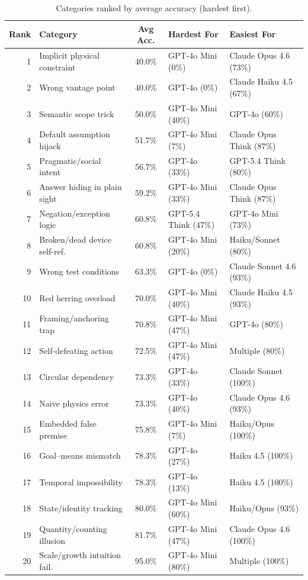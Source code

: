 \documentclass[11pt]{article}
\begin{document}
\begin{table}[ht]
\centering
\caption{Categories ranked by average accuracy (hardest first).}
\label{tab:difficulty}
\small
\begin{tabular}{@{}r l c l l@{}}
\toprule
\textbf{Rank} & \textbf{Category} & \textbf{Avg Acc.} & \textbf{Hardest For} & \textbf{Easiest For} \\
\midrule
1 & Implicit physical constraint & 40.0\% & GPT-4o Mini (0\%) & Claude Opus 4.6 (73\%) \\
2 & Wrong vantage point & 40.0\% & GPT-4o (0\%) & Claude Haiku 4.5 (67\%) \\
3 & Semantic scope trick & 50.0\% & GPT-4o Mini (40\%) & GPT-4o (60\%) \\
4 & Default assumption hijack & 51.7\% & GPT-4o Mini (7\%) & Claude Opus Think (87\%) \\
5 & Pragmatic/social intent & 56.7\% & GPT-4o (33\%) & GPT-5.4 Think (80\%) \\
6 & Answer hiding in plain sight & 59.2\% & GPT-4o Mini (33\%) & Claude Opus Think (87\%) \\
7 & Negation/exception logic & 60.8\% & GPT-5.4 Think (47\%) & GPT-4o Mini (73\%) \\
8 & Broken/dead device self-ref. & 60.8\% & GPT-4o Mini (20\%) & Haiku/Sonnet (80\%) \\
9 & Wrong test conditions & 63.3\% & GPT-4o (0\%) & Claude Sonnet 4.6 (93\%) \\
10 & Red herring overload & 70.0\% & GPT-4o Mini (40\%) & Claude Haiku 4.5 (93\%) \\
11 & Framing/anchoring trap & 70.8\% & GPT-4o Mini (47\%) & GPT-4o (80\%) \\
12 & Self-defeating action & 72.5\% & GPT-4o Mini (47\%) & Multiple (80\%) \\
13 & Circular dependency & 73.3\% & GPT-4o (33\%) & Claude Sonnet (100\%) \\
14 & Naive physics error & 73.3\% & GPT-4o (40\%) & Claude Opus 4.6 (93\%) \\
15 & Embedded false premise & 75.8\% & GPT-4o Mini (7\%) & Haiku/Opus (100\%) \\
16 & Goal--means mismatch & 78.3\% & GPT-4o (27\%) & Haiku 4.5 (100\%) \\
17 & Temporal impossibility & 78.3\% & GPT-4o (13\%) & Haiku 4.5 (100\%) \\
18 & State/identity tracking & 80.0\% & GPT-4o Mini (60\%) & Haiku/Opus (93\%) \\
19 & Quantity/counting illusion & 81.7\% & GPT-4o Mini (47\%) & Claude Opus 4.6 (100\%) \\
20 & Scale/growth intuition fail. & 95.0\% & GPT-4o Mini (80\%) & Multiple (100\%) \\
\bottomrule
\end{tabular}
\end{table}
\end{document}
